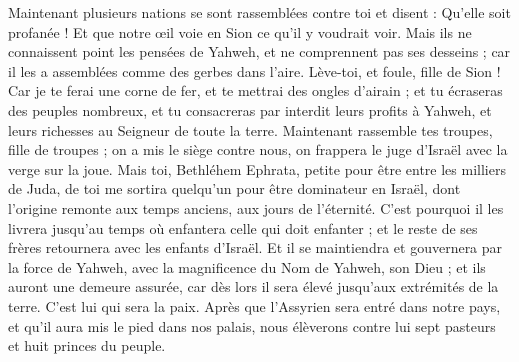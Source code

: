 \begin{multicols}{2}
Maintenant plusieurs nations se sont rassemblées contre toi et disent : Qu'elle soit profanée ! Et que notre œil voie en Sion ce qu'il y voudrait voir.
Mais ils ne connaissent point les pensées de Yahweh, et ne comprennent pas ses desseins ; car il les a assemblées comme des gerbes dans l'aire.
Lève-toi, et foule, fille de Sion ! Car je te ferai une corne de fer, et te mettrai des ongles d'airain ; et tu écraseras des peuples nombreux, et tu consacreras par interdit leurs profits à Yahweh, et leurs richesses au Seigneur de toute la terre.
Maintenant rassemble tes troupes, fille de troupes ; on a mis le siège contre nous, on frappera le juge d'Israël avec la verge sur la joue.
\VerseOne{}Mais toi, Bethléhem Ephrata, petite pour être entre les milliers de Juda, de toi me sortira quelqu'un pour être dominateur en Israël, dont l'origine remonte aux temps anciens, aux jours de l'éternité.
C'est pourquoi il les livrera jusqu'au temps où enfantera celle qui doit enfanter ; et le reste de ses frères retournera avec les enfants d'Israël.
Et il se maintiendra et gouvernera par la force de Yahweh, avec la magnificence du Nom de Yahweh, son Dieu ; et ils auront une demeure assurée, car dès lors il sera élevé jusqu'aux extrémités de la terre.
C'est lui qui sera la paix. Après que l'Assyrien sera entré dans notre pays, et qu'il aura mis le pied dans nos palais, nous élèverons contre lui sept pasteurs et huit princes du peuple.

\end{multicols}

